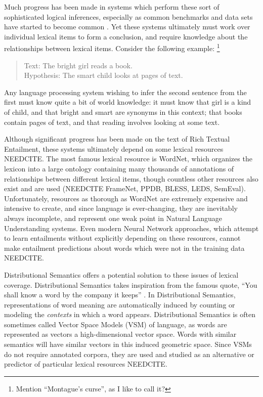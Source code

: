 \documentclass[letterpaper]{article}
\begin{document}
Much progress has been made in systems which perform these sort of sophisticated
logical inferences, especially as common benchmarks and data sets have started
to become common \cite{marelli:2014:semeval,bowman:2015:emnlp,needcite}. Yet these
systems ultimately must work over individual lexical items to form a
conclusion, and require knowledge about the relationships between lexical
items. Consider the following example:
\footnote{Mention ``Montague's curse'', as I like to call it?}
\begin{quote}
  Text: The bright girl reads a book.\\
  Hypothesis: The smart child looks at pages of text.
\end{quote}
Any language processing system wishing to infer the second sentence from
the first must know quite a bit of world knowledge: it must know that
girl is a kind of child, and that bright and smart are synonyms in this
context; that books contain pages of text, and that reading involves looking
at some text.

Although significant progress has been made on the text of
Rich Textual Entailment, these systems ultimately depend on some lexical
resources NEEDCITE. The most famous lexical resource is WordNet, which
organizes the lexicon into a large ontology containing many thousands of
annotations of relationships between different lexical items, though countless
other resources also exist and are used (NEEDCITE FrameNet, PPDB, BLESS, LEDS,
SemEval). Unfortunately, resources as thorough as WordNet are extremely
expensive and intensive to create, and since language is ever-changing, they
are inevitably always incomplete, and represent one weak point in Natural
Language Understanding systems. Even modern Neural Network approaches,
which attempt to learn entailments without explicitly depending on these
resources, cannot make entailment predictions about words which were not
in the training data NEEDCITE.

Distributional Semantics offers a potential solution to these issues of lexical
coverage. Distributional Semantics takes inspiration from the famous quote,
``You shall know a word by the company it keeps'' \cite{firth:1957:la}. In
Distributional Semantics, representations of word meaning are automatically
induced by counting or modeling the {\em contexts} in which a word appears.
Distributional Semantics is often sometimes called Vector Space Models (VSM) of
language, as words are represented as vectors a high-dimensional vector space.
Words with similar semantics will have similar vectors in this induced
geometric space. Since VSMs do not require annotated corpora, they are used and
studied as an alternative or predictor of particular lexical resources NEEDCITE.
\end{document}
